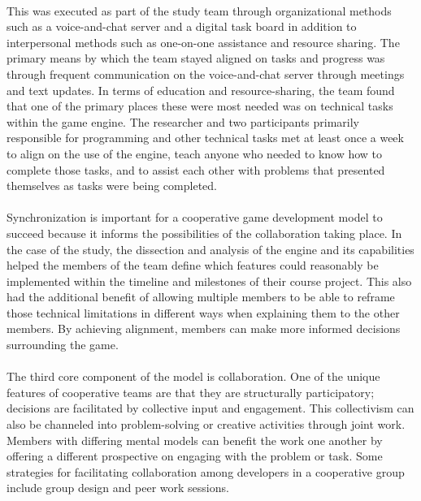 \paragraph{} This was executed as part of the study team through organizational methods such as a voice-and-chat server and a digital task board in addition to interpersonal methods such as one-on-one assistance and resource sharing. The primary means by which the team stayed aligned on tasks and progress was through frequent communication on the voice-and-chat server through meetings and text updates. In terms of education and resource-sharing, the team found that one of the primary places these were most needed was on technical tasks within the game engine. The researcher and two participants primarily responsible for programming and other technical tasks met at least once a week to align on the use of the engine, teach anyone who needed to know how to complete those tasks, and to assist each other with problems that presented themselves as tasks were being completed.

\paragraph{} Synchronization is important for a cooperative game development model to succeed because it informs the possibilities of the collaboration taking place. In the case of the study, the dissection and analysis of the engine and its capabilities helped the members of the team define which features could reasonably be implemented within the timeline and milestones of their course project. This also had the additional benefit of allowing multiple members to be able to reframe those technical limitations in different ways when explaining them to the other members. By achieving alignment, members can make more informed decisions surrounding the game. 

\paragraph{} The third core component of the model is collaboration. One of the unique features of cooperative teams are that they are structurally participatory; decisions are facilitated by collective input and engagement. This collectivism can also be channeled into problem-solving or creative activities through joint work. Members with differing mental models can benefit the work one another by offering a different prospective on engaging with the problem or task. Some strategies for facilitating collaboration among developers in a cooperative group include group design and peer work sessions.

